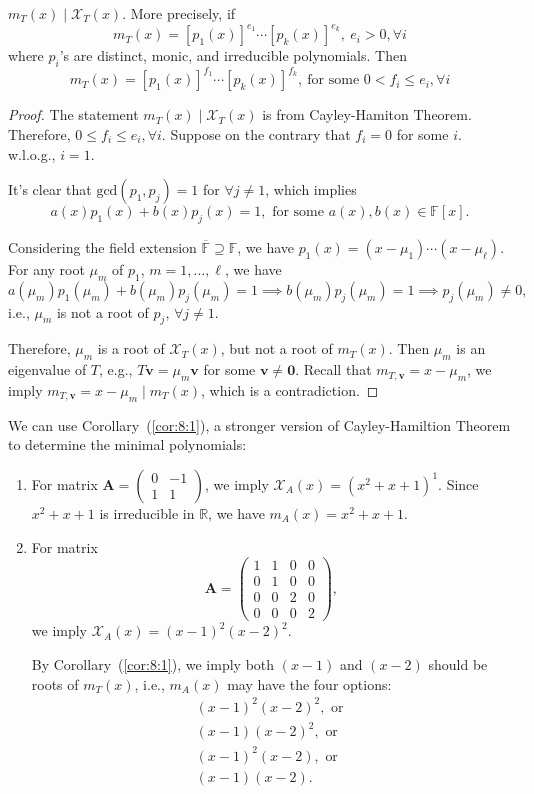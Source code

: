 \begin{corollary}\label{cor:8:1}
$m_T(x)\mid\mathcal{X}_T(x)$.
More precisely,
if
\[
m_T(x) = [p_1(x)]^{e_1}\cdots[p_k(x)]^{e_k},\ e_i>0,\forall i
\]
where $p_i$'s are distinct, monic, and irreducible polynomials.
Then
\[
m_T(x)=[p_1(x)]^{f_1}\cdots[p_k(x)]^{f_k},\ \text{for some }0<f_i\le e_i,\forall i
\]
\end{corollary}
\begin{proof}
The statement $m_T(x)\mid\mathcal{X}_T(x)$ is from Cayley-Hamiton Theorem.
Therefore, $0\le f_i\le e_i,\forall i$.
Suppose on the contrary that $f_i=0$ for some $i$.
w.l.o.g., $i=1$.

It's clear that $\text{gcd}(p_1,p_j)=1$ for $\forall j\ne 1$, which implies
\[
a(x)p_1(x)+b(x)p_j(x)=1,\text{ for some }a(x),b(x)\in\mathbb{F}[x].
\]

Considering the field extension $\overline{\mathbb{F}}\supseteq\mathbb{F}$, we have
$p_1(x)=(x-\mu_1)\cdots(x-\mu_\ell)$.
For any root $\mu_m$ of $p_1$, $m=1,\dots,\ell$, we have
\[
a(\mu_m)p_1(\mu_m)+b(\mu_m)p_j(\mu_m)=1
\implies
b(\mu_m)p_j(\mu_m)=1
\implies
p_j(\mu_m)\ne0,
\]
i.e., $\mu_m$ is not a root of $p_j$, $\forall j\ne1$.

Therefore, $\mu_m$ is a root of $\mathcal{X}_T(x)$, but not a root of $m_T(x)$.
Then $\mu_m$ is an eigenvalue of $T$, e.g., $T\bm v=\mu_m\bm v$ for some $\bm v\ne\bm0$.
Recall that $m_{T,\bm v}=x-\mu_m$,
we imply $m_{T,\bm v}=x-\mu_m\mid m_T(x)$, which is a contradiction.
\end{proof}





\begin{example}
We can use Corollary~(\ref{cor:8:1}), a stronger version of Cayley-Hamiltion Theorem to determine the minimal polynomials:
\begin{enumerate}
\item
For matrix $\bm A=\begin{pmatrix}
0&-1\\1&1
\end{pmatrix}$, we imply $\mathcal{X}_{A}(x)=(x^2+x+1)^1$.
Since $x^2+x+1$ is irreducible in $\mathbb{R}$, we have $m_A(x)=x^2+x+1$.
\item
For matrix 
\[
\bm A=\begin{pmatrix}
1&1&0&0\\0&1&0&0\\0&0&2&0\\0&0&0&2
\end{pmatrix},
\]
we imply $\mathcal{X}_A(x)=(x-1)^2(x-2)^2$.

By Corollary~(\ref{cor:8:1}), we imply both $(x-1)$ and $(x-2)$ should be roots of $m_T(x)$, i.e., $m_A(x)$ may have the four options:
\begin{align*}
(x-1)^2(x-2)^2,\text{ or }\\
(x-1)(x-2)^2,\text{ or }\\
(x-1)^2(x-2),\text{ or }\\
(x-1)(x-2).
\end{align*}
\end{enumerate}
\end{example}
